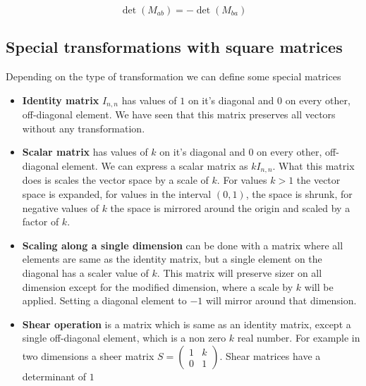  \[\det(M_{ab}) = -\det(M_{ba})\]

\subsection{Special transformations with square matrices}

Depending on the type of transformation we can define some special matrices

\begin{itemize}
    \item \textbf{Identity matrix} \(I_{n,n}\) has values of \(1\) on it's diagonal and \(0\) on every other, off-diagonal element. We have seen that this matrix preserves all vectors without any transformation.
\end{itemize}

\begin{itemize}
    \item \textbf{Scalar matrix} has values of \(k\) on it's diagonal and \(0\) on every other, off-diagonal element. We can express a scalar matrix as \(kI_{n,n}\). What this matrix does is scales the vector space by a scale of \(k\). For values \(k > 1\) the vector space is expanded, for values in the interval \((0, 1)\), the space is shrunk, for negative values of \(k\) the space is mirrored around the origin and scaled by a factor of \(k\).
\end{itemize}

\begin{itemize}
    \item \textbf{Scaling along a single dimension} can be done with a matrix where all elements are same as the identity matrix, but a single element on the diagonal has a scaler value of \(k\). This matrix will preserve sizer on all dimension except for the modified dimension, where a scale by \(k\) will be applied. Setting a diagonal element to \(-1\) will mirror around that dimension.
\end{itemize}

\begin{itemize}
    \item \textbf{Shear operation} is a matrix which is same as an identity matrix, except a single off-diagonal element, which is a non zero \(k\) real number. For example in two dimensions a sheer matrix \(S = \begin{pmatrix}
1 & k \\
0 & 1
\end{pmatrix}\). Shear matrices have a determinant of \(1\)
\end{itemize}

